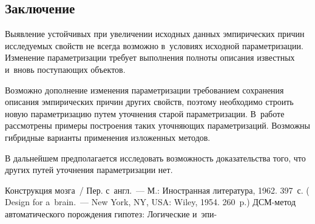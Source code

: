 \begin{multicols}{2}
\vspace*{-6pt}
   
\section{Заключение}
  
  Выявление устойчивых при увеличении исходных данных эмпирических 
причин исследуемых свойств не всегда возможно в~условиях исходной 
параметризации. Изменение параметризации требует выполнения полноты 
описания известных и~вновь поступающих объектов.
  
  Возможно дополнение изменения параметризации требованием сохранения 
описания эмпирических причин других свойств, поэтому необходимо строить 
новую параметризацию путем уточнения старой параметризации. В~работе 
рассмотрены примеры построения таких уточняющих параметризаций. Возможны 
гибридные варианты применения изложенных методов.
  
  В дальнейшем предполагается исследовать возможность доказательства того, 
что других путей уточнения параметризации нет.

\vspace*{-6pt}
  
{\small\frenchspacing
 {%
 \begin{thebibliography}{9}
 Конструкция мозга~/ Пер. с~англ.~--- М.: Иностранная литература, 1962. 
397~с. ( Design for a~brain.~--- New York, NY, USA: Wiley, 
1954. 260~p.)
 ДСМ-ме\-тод автоматического порождения гипотез: 
Логические и~эпи-\linebreak\vspace*{-12pt}

\pagebreak


\end{thebibliography}}}
\end{multicols}
